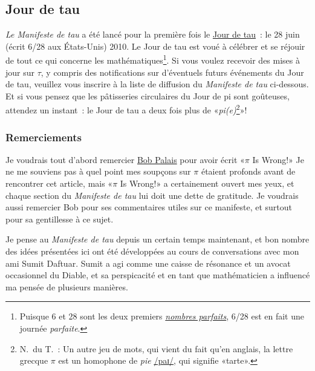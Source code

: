   \subsection{Jour de tau} %
  \label{sec:tau_day}

\emph{Le Manifeste de tau} a été lancé pour la première fois le
\href{https://tauday.com/}{Jour de tau}~: le 28 juin (écrit 6/28 aux États-Unis)
2010. Le Jour de tau est voué à célébrer et se réjouir de tout ce qui
concerne les mathématiques\ns\footnote{Puisque 6 et 28 sont les deux premiers
\href{https://fr.wikipedia.org/wiki/Nombre_parfait}{\emph{nombres parfaits}},
6/28 est en fait une journée \emph{parfaite}.}. Si vous voulez recevoir des
mises à jour sur $\tau$, y compris des notifications sur d'éventuels futurs événements
du Jour de tau, veuillez vous inscrire à la liste de diffusion du
\emph{Manifeste de tau} ci-dessous. Et si vous pensez que les pâtisseries
circulaires du Jour de pi sont goûteuses, attendez un instant~: le Jour de tau a
deux fois plus de «\ns \emph{pi(e)}\ns\footnote{N.\ du T.~: Un autre jeu de mots,
qui vient du fait qu'en anglais, la lettre grecque $\pi$ est un
homophone de \emph{pie}
\href{https://fr.wikipedia.org/wiki/Alphabet_phonétique_international}{/paɪ/},
qui signifie «\ns tarte\ns ».}\ns »\ns!


  \subsubsection{Remerciements} %
  \label{sec:acknowledgments}

Je voudrais tout d'abord remercier
\href{https://translate.google.com/translate?hl=en&sl=en&tl=fr&u=https://www.math.utah.edu/~palais/}{Bob
Palais} pour avoir écrit «\ns $\pi$ Is Wrong!\ns » Je ne me souviens pas à quel point
mes soupçons sur $\pi$ étaient profonds avant de rencontrer cet article, mais
«\ns $\pi$ Is Wrong!\ns » a certainement ouvert mes yeux, et chaque section du
\emph{Manifeste de tau} lui doit une dette de gratitude. Je voudrais aussi
remercier Bob pour ses commentaires utiles sur ce manifeste, et surtout pour sa
gentillesse à ce sujet.

Je pense au \emph{Manifeste de tau} depuis un certain temps maintenant, et bon
nombre des idées présentées ici ont été développées au cours de conversations
avec mon ami Sumit Daftuar. Sumit a agi comme une caisse de résonance et un
avocat occasionnel du Diable, et sa perspicacité et en tant que mathématicien a
influencé ma pensée de plusieurs manières.

